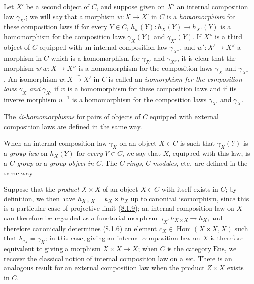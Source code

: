 \begin{env}[8.2.2]
\label{0.8.2.2}
Let $X'$ be a second object of $C$, and suppose given on $X'$ an internal
composition law $\gamma_{X'}$; we will say that a morphism
$w:X\to X'$ in $C$ is a \emph{homomorphism} for these composition
laws if for every $Y\in C$, $h_w(Y):h_X(Y)\to h_{X'}(Y)$ is a
homomorphism for the composition laws $\gamma_X(Y)$ and
$\gamma_{X'}(Y)$. If $X''$ is a third
object of $C$ equipped with an internal composition law $\gamma_{X''}$, and
$w':X'\to X''$ a morphism in $C$ which is a homomorphism for
$\gamma_{X'}$ and $\gamma_{X''}$, it is clear that the morphism
$w'w:X\to X''$ is a homomorphism for the composition laws $\gamma_X$
and $\gamma_{X''}$. An isomorphism $w:X\xrightarrow{\sim}X'$ in $C$ is
called an \emph{isomorphism for the composition laws $\gamma_X$ and
$\gamma_{X'}$} if $w$ is a homomorphism for these composition laws and
if its inverse morphism $w^{-1}$ is a homomorphism for the composition
laws $\gamma_{X'}$ and $\gamma_X$.

The \emph{di-homomorphisms} for pairs of objects of $C$ equipped with
external composition laws are defined in the same way.
\end{env}

\begin{env}[8.2.3]
\label{0.8.2.3}
When an internal composition law $\gamma_X$ on an object $X\in C$ is
such that $\gamma_X(Y)$ is a \emph{group law} on $h_X(Y)$ for
\emph{every} $Y\in C$, we say that $X$, equipped with this law, is a
\emph{$C$-group} or a \emph{group object in $C$}. The
\emph{$C$-rings}, \emph{$C$-modules}, etc.\ are defined in the same way.
\end{env}

\begin{env}[8.2.4]
\label{0.8.2.4}
Suppose that the \emph{product} $X\times X$ of an object $X\in C$ with itself
exists in $C$; by definition, we then have
$h_{X\times X}=h_X\times h_X$ up to canonical isomorphism, since this is
a particular case of projective limit
(\hyperref[0.8.1.9]{8.1.9}); an internal composition law on $X$ can
therefore be regarded as a functorial morphism
$\gamma_X:h_{X\times X}\to h_X$, and therefore canonically determines
(\hyperref[0.8.1.6]{8.1.6}) an element
$c_X\in\operatorname{Hom}(X\times X,X)$ such that $h_{c_X}=\gamma_X$; in
this case, giving an internal composition law on $X$ is therefore
equivalent to giving a morphism $X\times X\to X$; when $C$ is the
category $\mathrm{Ens}$, we recover the classical notion of internal
composition law on a set. There is an analogous result for an external
composition law when the product $Z\times X$ exists in $C$.
\end{env}

